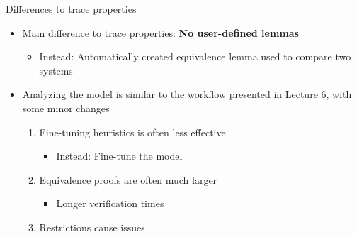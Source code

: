 \documentclass[11pt,aspectratio=169]{beamer}
\begin{document}
\begin{frame}[fragile]{Differences to trace properties}
    \begin{itemize}
        \item Main difference to trace properties:
              \textbf{No user-defined lemmas}
        \begin{itemize}
            \item Instead: Automatically created equivalence lemma used to 
                  compare two systems
        \end{itemize}
        \item Analyzing the model is similar to the workflow presented in 
              Lecture 6, with some minor changes
        \begin{enumerate}
            \item Fine-tuning heuristics is often less effective
            \begin{itemize}
                \item Instead: Fine-tune the model
            \end{itemize}
            \item Equivalence proofs are often much larger
            \begin{itemize}
                \item Longer verification times
            \end{itemize}
            \item Restrictions cause issues
        \end{enumerate}
    \end{itemize}
\end{frame}
\end{document}
